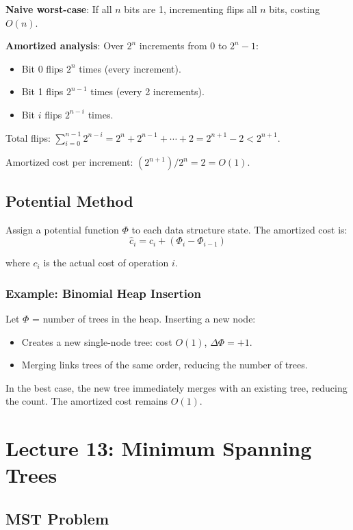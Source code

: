 \documentclass[11pt]{article}
\begin{document}
{{{\textbf{Naive worst-case}: If all $n$ bits are 1, incrementing flips all $n$ bits, costing $O(n)$.

\textbf{Amortized analysis}: Over $2^n$ increments from 0 to $2^n - 1$:
\begin{itemize}
\item Bit 0 flips $2^n$ times (every increment).
\item Bit 1 flips $2^{n-1}$ times (every 2 increments).
\item Bit $i$ flips $2^{n-i}$ times.
\end{itemize}

Total flips: $\sum_{i=0}^{n-1} 2^{n-i} = 2^n + 2^{n-1} + \cdots + 2 = 2^{n+1} - 2 < 2^{n+1}$.

Amortized cost per increment: $(2^{n+1}) / 2^n = 2 = O(1)$.

\subsection*{Potential Method}

Assign a potential function $\Phi$ to each data structure state. The amortized cost is:
\[
\hat{c}_i = c_i + (\Phi_i - \Phi_{i-1})
\]

where $c_i$ is the actual cost of operation $i$.

\subsubsection*{Example: Binomial Heap Insertion}
Let $\Phi$ = number of trees in the heap. Inserting a new node:
\begin{itemize}
\item Creates a new single-node tree: cost $O(1)$, $\Delta\Phi = +1$.
\item Merging links trees of the same order, reducing the number of trees.
\end{itemize}

In the best case, the new tree immediately merges with an existing tree, reducing the count. The amortized cost remains $O(1)$.

\section{Lecture 13: Minimum Spanning Trees}

\subsection*{MST Problem}

}}}
\end{document}
